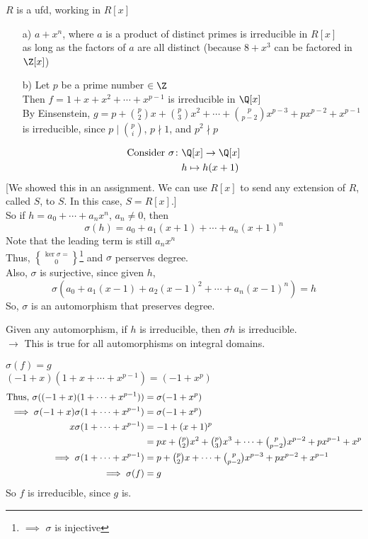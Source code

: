 \exs $R$ is a ufd, working in $R[x]$
\begin{enumerate}
\item[a)] $a+x^n$, where $a$ is a product of distinct primes is irreducible in $R[x]$ \\
as long as the factors of $a$ are all distinct (because $8+x^3$ can be factored in $\Z[x]$)
\item[b)] Let $p$ be a prime number $\in\Z$ \\
Then $f=1+x+x^2+\dotsb+x^{p-1}$ is irreducible in $\Q[x]$ \\
\pf By Einsenstein, $g=p+\binom p2x+\binom p3x^2+\dotsb+\binom p{p-2}x^{p-3}+px^{p-2}+x^{p-1}$ is irreducible, since $p\mid\binom pi$, $p\nmid1$, and $p^2\nmid p$
\end{enumerate}
\begin{align*}
\text{Consider } \sigma\colon & \Q[x] \to \Q[x] \\
& h \mapsto h(x+1)
\end{align*}
[We showed this in an assignment.  We can use $R[x]$ to send any extension of $R$, called $S$, to $S$.  In this case, $S=R[x]$.] \\
So if $h=a_0+\dotsb+a_nx^n$, $a_n\neq0$, then
\[ \sigma(h) = a_0 + a_1(x+1) + \dotsb + a_n(x+1)^n \]
Note that the leading term is still $a_nx^n$ \\
Thus, $\ker\sigma=\brace0$\footnote{$\implies$ $\sigma$ is injective} and $\sigma$ perserves degree. \\
Also, $\sigma$ is surjective, since given $h$,
\[ \sigma(a_0+a_1(x-1)+a_2(x-1)^2+\dotsb+a_n(x-1)^n) = h \]
So, $\sigma$ is an automorphism that preserves degree.

\exer Given any automorphism, if $h$ is irreducible, then $\sigma h$ is irreducible. \\
$\to$ This is true for all automorphisms on integral domains.

\claim $\sigma(f)=g$ \\
$(-1+x)(1+x+\dotsb+x^{p-1})=(-1+x^p)$
\begin{align*}
\text{Thus, } \sigma((-1+x)(1+\dotsb+x^{p-1})) &= \sigma(-1+x^p) \\
\implies \sigma(-1+x)\sigma(1+\dotsb+x^{p-1}) &= \sigma(-1+x^p) \\
x\sigma(1+\dotsb+x^{p-1}) &= -1 + (x+1)^p \\
&= px + \tbinom p2x^2 + \tbinom p3x^3 + \dotsb + \tbinom p{p-2}x^{p-2} + px^{p-1} + x^p \\
\implies \sigma(1+\dotsb+x^{p-1}) &= p + \tbinom p2x+\dotsb+\tbinom p{p-2}x^{p-3}+px^{p-2}+x^{p-1} \\
\implies \sigma(f) &= g
\end{align*}
So $f$ is irreducible, since $g$ is.

